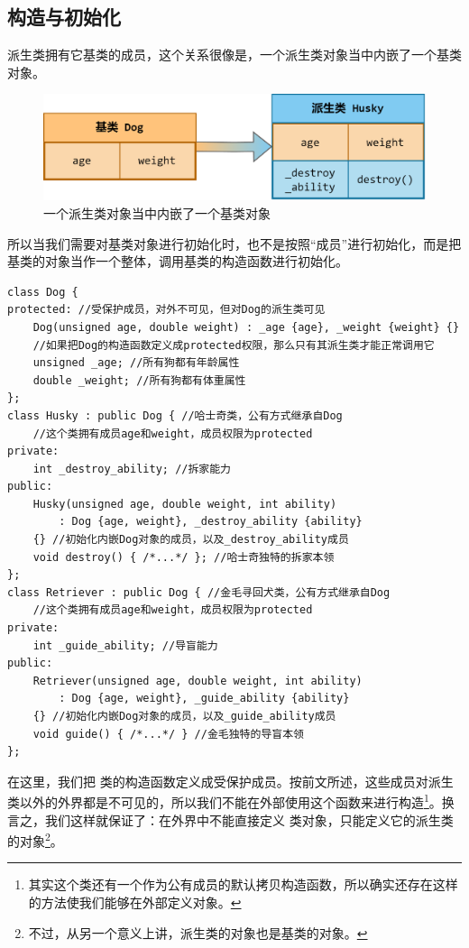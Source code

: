 \subsection*{构造与初始化}
派生类拥有它基类的成员，这个关系很像是，一个派生类对象当中内嵌了一个基类对象。
\begin{figure}[htbp]
    \centering
    \includegraphics[width=.8\textwidth]{images/generalized_parts/09_built_in_base_class_object_in_derived_class_300.png}
    \caption{一个派生类对象当中内嵌了一个基类对象}
\end{figure}
所以当我们需要对基类对象进行初始化时，也不是按照``成员''进行初始化，而是把基类的对象当作一个整体，调用基类的构造函数进行初始化。\par
\begin{lstlisting}
class Dog {
protected: //受保护成员，对外不可见，但对Dog的派生类可见
    Dog(unsigned age, double weight) : _age {age}, _weight {weight} {}
    //如果把Dog的构造函数定义成protected权限，那么只有其派生类才能正常调用它
    unsigned _age; //所有狗都有年龄属性
    double _weight; //所有狗都有体重属性
};
class Husky : public Dog { //哈士奇类，公有方式继承自Dog
    //这个类拥有成员age和weight，成员权限为protected
private:
    int _destroy_ability; //拆家能力
public:
    Husky(unsigned age, double weight, int ability)
        : Dog {age, weight}, _destroy_ability {ability}
    {} //初始化内嵌Dog对象的成员，以及_destroy_ability成员
    void destroy() { /*...*/ }; //哈士奇独特的拆家本领
};
class Retriever : public Dog { //金毛寻回犬类，公有方式继承自Dog
    //这个类拥有成员age和weight，成员权限为protected
private:
    int _guide_ability; //导盲能力
public:
    Retriever(unsigned age, double weight, int ability)
        : Dog {age, weight}, _guide_ability {ability}
    {} //初始化内嵌Dog对象的成员，以及_guide_ability成员
    void guide() { /*...*/ } //金毛独特的导盲本领
};
\end{lstlisting}\par
在这里，我们把 \lstinline@Dog@ 类的构造函数定义成受保护成员。按前文所述，这些成员对派生类以外的外界都是不可见的，所以我们不能在外部使用这个函数来进行构造\footnote{其实这个类还有一个作为公有成员的默认拷贝构造函数，所以确实还存在这样的方法使我们能够在外部定义对象。}。换言之，我们这样就保证了：在外界中不能直接定义 \lstinline@Dog@ 类对象，只能定义它的派生类的对象\footnote{不过，从另一个意义上讲，派生类的对象也是基类的对象。}。\par
